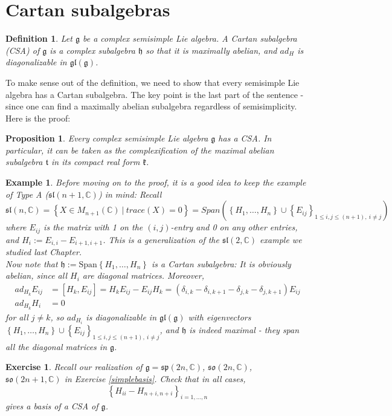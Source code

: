 \documentclass[11pt]{book}
\newtheorem{proposition}[theorem]{Proposition}
\newtheorem{example}[theorem]{Example}
\newtheorem{exercise}[theorem]{Exercise}
\newtheorem{definition}[theorem]{Definition}
\newcommand{\bb}[1]{\mathbb{#1}}
\newcommand{\mf}[1]{\mathfrak{#1}}
\begin{document}
\section{Cartan subalgebras}
\begin{definition}
Let $\mf{g}$ be a complex semisimple Lie algebra. A Cartan subalgebra (CSA) of $\mf{g}$ is a complex subalgebra $\mf{h}$ so that it is maximally abelian, and $ad_H$ is diagonalizable in $\mf{gl}(\mf{g})$.
\end{definition}
To make sense out of the definition, we need to show that every semisimple Lie algebra has a Cartan subalgebra. The key point is the last part of the sentence - since one can find a maximally abelian subalgebra regardless of semisimplicity. Here is the proof:
\begin{proposition}
Every complex semisimple Lie algebra $\mf{g}$ has a CSA. In particular, it can be taken as the complexification of the maximal abelian subalgebra $\mf{t}$ in its compact real form $\mf{k}$.
\end{proposition}
\begin{example}
Before moving on to the proof, it is a good idea to keep the example of Type A ($\mf{sl}(n+1,\bb{C})$) in mind: Recall
$$\mf{sl}(n,\bb{C}) = \left\{X \in M_{n+1}(\bb{C})\ \Big|\ trace(X) = 0 \right\} = Span(\left\{ H_1, \dots, H_n \right\} \cup \left\{E_{ij} \right\}_{1 \leq i,j \leq (n+1),\ i \neq j })$$
where $E_{ij}$ is the matrix with 1 on the $(i,j)$-entry and 0 on any other entries, and $H_i := E_{i,i} - E_{i+1,i+1}$. This is a generalization of the $\mf{sl}(2,\bb{C})$ example we studied last Chapter.\\
Now note that $\mf{h} := \mathrm{Span}\left\{ H_1, \dots, H_n \right\}$ is a Cartan subalgebra: It is obviously abelian, since all $H_i$ are diagonal matrices. Moreover,
\begin{align} \label{bracketrel}
ad_{H_k}E_{ij} &= [H_k, E_{ij}] = H_kE_{ij} - E_{ij}H_k = (\delta_{i,k} - \delta_{i,k+1} - \delta_{j,k} - \delta_{j, k+1})E_{ij}\\
ad_{H_k}H_i &= 0
\end{align}
for all $j \neq k$, so $ad_{H_i}$ is diagonalizable in $\mf{gl}(\mf{g})$ with eigenvectors $\left\{ H_1, \dots, H_n \right\} \cup \left\{E_{ij} \right\}_{1 \leq i,j \leq (n+1),\ i \neq j }$, and $\mf{h}$ is indeed maximal - they span all the diagonal matrices in $\mf{g}$.
\end{example}
\begin{exercise}
Recall our realization of $\mf{g} = \mf{sp}(2n,\bb{C})$, $\mf{so}(2n,\bb{C})$, $\mf{so}(2n+1,\bb{C})$ in Exercise \ref{simplebasis}. Check that in all cases,
$$\left\{ H_{ii} - H_{n+i, n+i}\right\}_{i = 1, \dots, n}$$
gives a basis of a CSA of $\mf{g}$.
\end{exercise}
\end{document}
